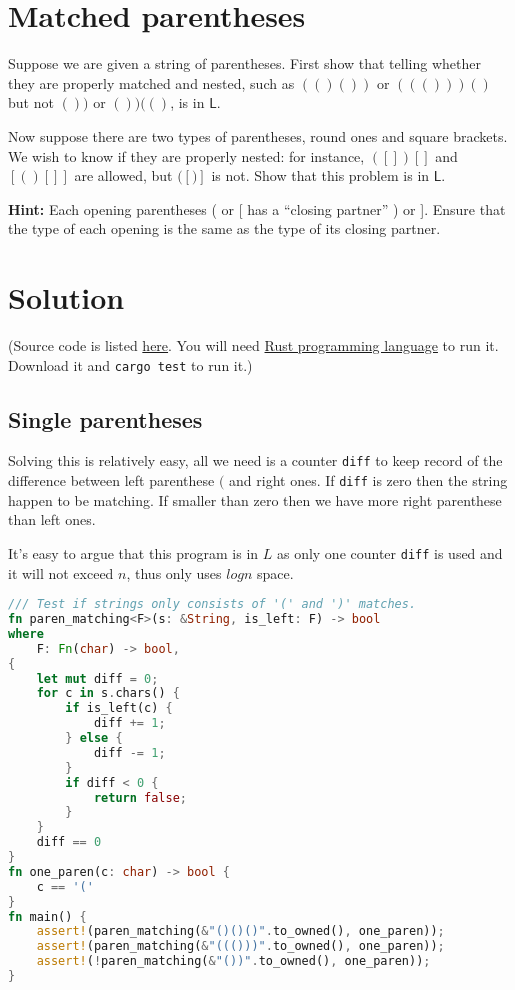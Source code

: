 

\maketitle
\thispagestyle{firststyle}
\vspace{-2.0cm}


\section*{Matched parentheses}
Suppose we are given a string of parentheses.
First show that telling whether they are properly matched and nested,
such as $(()())$ or $((()))()$ but not $())$ or $())(()$,
is in $\mathsf{L}$.

Now suppose there are two types of parentheses, round ones and square brackets.
We wish to know if they are properly nested: for instance,
$([])[]$ and $[()[]]$ are allowed,
but $([)]$ is not.
Show that this problem is in $\mathsf{L}$.

    {\bf Hint:} Each opening parentheses ( or [ has a ``closing partner'' ) or ].
Ensure that the type of each opening is the same as the type of its closing partner.


\section*{Solution}

(Source code is listed \href{https://github.com/DataCorrupted/parentheses-matching}{here}.
You will need \href{https://www.rust-lang.org/}{Rust programming language} to run it.
Download it and \lstinline{cargo test} to run it.)

\subsection*{Single parentheses}

Solving this is relatively easy, all we need is a counter \lstinline{diff} to keep record of the difference between left parenthese $($ and right ones.
If \lstinline{diff} is zero then the string happen to be matching.
If smaller than zero then we have more right parenthese than left ones.

It's easy to argue that this program is in $L$ as only one counter \lstinline{diff} is used and it will not exceed $n$, thus only uses $log n$ space.

\begin{lstlisting}[language=Rust]
/// Test if strings only consists of '(' and ')' matches.
fn paren_matching<F>(s: &String, is_left: F) -> bool
where
    F: Fn(char) -> bool,
{
    let mut diff = 0;
    for c in s.chars() {
        if is_left(c) {
            diff += 1;
        } else {
            diff -= 1;
        }
        if diff < 0 {
            return false;
        }
    }
    diff == 0
}
fn one_paren(c: char) -> bool {
    c == '('
}
fn main() {
    assert!(paren_matching(&"()()()".to_owned(), one_paren));
    assert!(paren_matching(&"((()))".to_owned(), one_paren));
    assert!(!paren_matching(&"())".to_owned(), one_paren));
}
\end{lstlisting}

